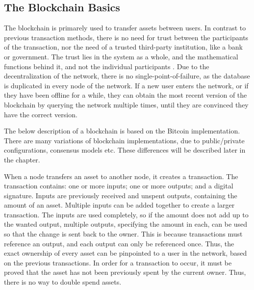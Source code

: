 \subsection{The Blockchain Basics}
The blockchain is primarely used to transfer assets between users. In contrast to previous transaction methods, there is no need for trust between the participants of the transaction, nor the need of a trusted third-party institution, like a bank or government. The trust lies in the system as a whole, and the mathematical functions behind it, and not the individual participants \cite{Nofer}. Due to the decentralization of the network, there is no single-point-of-failure, as the database is duplicated in every node of the network. If a new user enters the network, or if they have been offline for a while, they can obtain the most recent version of the blockchain by querying the network multiple times, until they are convinced they have the correct version. 

The below description of a blockchain is based on the Bitcoin implementation. There are many variations of blockchain implementations, due to public/private configurations, consensus models etc. These differences will be described later in the chapter.

When a node transfers an asset to another node, it creates a transaction. The transaction contains: one or more inputs; one or more outputs; and a digital signature. Inputs are previously received and unspent outputs, containing the amount of an asset. Multiple inputs can be added together to create a larger transaction. The inputs are used completely, so if the amount does not add up to the wanted output, multiple outputs, specifying the amount in each, can be used so that the change is sent back to the owner. This is because transactions must reference an output, and each output can only be referenced once. Thus, the exact ownership of every asset can be pinpointed to a user in the network, based on the previous transactions. In order for a transaction to occur, it must be proved that the asset has not been previously spent by the current owner. Thus, there is no way to double spend assets.

